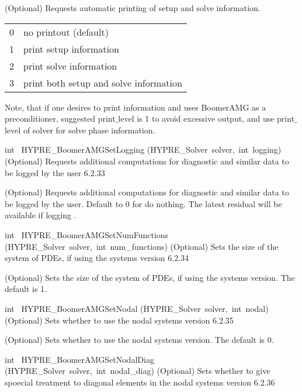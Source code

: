 \documentclass{article}
\begin{document}
\begin{cxxentry}
\begin{cxxentry}
\begin{cxxfunction}
\begin{cxxdoc}
(Optional) Requests automatic printing of setup and solve information.

\begin{tabular}{|c|l|} \hline
0 & no printout (default) \\
1 & print setup information \\
2 & print solve information \\
3 & print both setup and solve information \\
\hline
\end{tabular}

Note, that if one desires to print information and uses BoomerAMG as a 
preconditioner, suggested print$\_$level is 1 to avoid excessive output,
and use print$\_$level of solver for solve phase information.
\end{cxxdoc}
\end{cxxfunction}
\begin{cxxfunction}
{int\ }
        {HYPRE\_BoomerAMGSetLogging}
        {(HYPRE\_Solver\ solver,\ int\ logging)}
        {
(Optional) Requests additional computations for diagnostic and similar
data to be logged by the user}
        {6.2.33}
\begin{cxxdoc}

(Optional) Requests additional computations for diagnostic and similar
data to be logged by the user. Default to 0 for do nothing.  The latest
residual will be available if logging .
\end{cxxdoc}
\end{cxxfunction}
\begin{cxxfunction}
{int\ }
        {HYPRE\_BoomerAMGSetNumFunctions}
        {(HYPRE\_Solver\ solver,\ int\ num\_functions)}
        {
(Optional) Sets the size of the system of PDEs, if using the systems version}
        {6.2.34}
\begin{cxxdoc}

(Optional) Sets the size of the system of PDEs, if using the systems version.
The default is 1.
\end{cxxdoc}
\end{cxxfunction}
\begin{cxxfunction}
{int\ }
        {HYPRE\_BoomerAMGSetNodal}
        {(HYPRE\_Solver\ solver,\ int\ nodal)}
        {
(Optional) Sets whether to use the nodal systems version}
        {6.2.35}
\begin{cxxdoc}

(Optional) Sets whether to use the nodal systems version.
The default is 0.
\end{cxxdoc}
\end{cxxfunction}
\begin{cxxfunction}
{int\ }
        {HYPRE\_BoomerAMGSetNodalDiag}
        {(HYPRE\_Solver\ solver,\ int\ nodal\_diag)}
        {
(Optional) Sets whether to give spoecial treatment to diagonal elements in 
the nodal systems version}
        {6.2.36}
\begin{cxxdoc}


\end{cxxdoc}
\end{cxxfunction}
\end{cxxentry}
\end{cxxentry}
\end{document}
